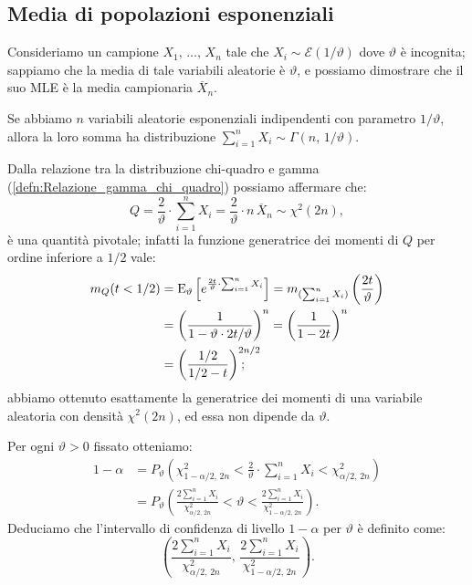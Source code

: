         \subsection{Media di popolazioni esponenziali}
            \begin{defn}[Intervallo bilatero con $\vartheta =\,?$]
                Consideriamo un campione $X_1,\, \ldots,\, X_{n}$ tale che $X_i \sim \mathcal{E}(1 /\vartheta)$ 
                dove $\vartheta$ è incognita; sappiamo che la media di tale variabili aleatorie è $\vartheta$, 
                e possiamo dimostrare che il suo MLE è la media campionaria $\overline{X}_n$.

                Se abbiamo $n$ variabili aleatorie esponenziali indipendenti con parametro $1 /\vartheta$, 
                allora la loro somma ha distribuzione $\sum_{i=1}^{n} X_i \sim \Gamma(n,\,1 /\vartheta)$.

                Dalla relazione tra la distribuzione chi-quadro e gamma (\ref{defn:Relazione_gamma_chi_quadro}) 
                possiamo affermare che: \[
                    Q = \frac{2}{\vartheta}\cdot \sum_{i=1}^{n} X_i = \frac{2}{\vartheta}\cdot n\,\overline{X}_n 
                    \sim \chi^2(2n)
                ,\] è una quantità pivotale; infatti la funzione generatrice dei momenti di $Q$ per ordine 
                inferiore a $1 /2$ vale:
                \begin{align*}
                    m_{Q}(t < 1 /2) &= \text{E}_{\vartheta}\left[e^{\frac{2t}{\vartheta}\cdot 
                    \sum_{i=1}^{n} X_i}\right] = m_{(\sum_{i=1}^{n} X_i)}\left(\frac{2t}{\vartheta}\right) \\
                    &= \left(\frac{1}{1-\vartheta\cdot 2t /\vartheta}\right)^n
                    = \left(\frac{1}{1-2t}\right)^n \\
                    &= \left(\frac{1 /2}{1 /2 -t}\right)^{2n /2}
                \hspace{-1.7em};\end{align*}
                abbiamo ottenuto esattamente la generatrice dei momenti di una variabile aleatoria con densità 
                $\chi^2(2n)$, ed essa non dipende da $\vartheta$.
                
                Per ogni $\vartheta > 0$ fissato otteniamo:
                \begin{align*}
                    1-\alpha &= P_\vartheta\left(\chi^2_{1-\alpha /2,\,2n} < \frac{2}{\vartheta}\cdot 
                    \sum_{i=1}^{n} X_i < \chi^2_{\alpha /2,\,2n}\right) \\
                    &= P_\vartheta\left(\frac{2\sum_{i=1}^{n} X_i}{\chi^2_{\alpha /2,\,2n}} < \vartheta 
                    < \frac{2\sum_{i=1}^{n} X_i}{\chi^2_{1-\alpha /2,\,2n}}\right)
                .\end{align*}
                Deduciamo che l'intervallo di confidenza di livello $1-\alpha$ per $\vartheta$ è definito 
                come: \[
                    \left(\frac{2\sum_{i=1}^{n} X_i}{\chi^2_{\alpha /2,\,2n}},\, 
                    \frac{2\sum_{i=1}^{n} X_i}{\chi^2_{1-\alpha /2,\,2n}}\right)
                .\]
            \end{defn}
